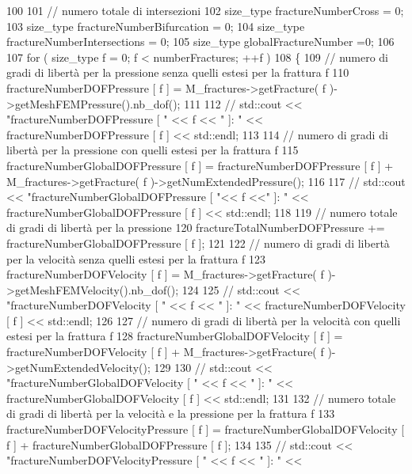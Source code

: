 \begin{DoxyCode}
100 
101     \textcolor{comment}{// numero totale di intersezioni}
102     size\_type fractureNumberCross = 0;
103     size\_type fractureNumberBifurcation = 0;
104     size\_type fractureNumberIntersections = 0;
105     size\_type globalFractureNumber =0;
106     
107     \textcolor{keywordflow}{for} ( size\_type f = 0; f < numberFractures; ++f )
108     \{
109         \textcolor{comment}{// numero di gradi di libertà per la pressione senza quelli estesi per la frattura f}
110         fractureNumberDOFPressure [ f ] = M\_fractures->getFracture( f )->getMeshFEMPressure().nb\_dof();
111         
112   \textcolor{comment}{//      std::cout << "fractureNumberDOFPressure [ " << f << " ]:  " << fractureNumberDOFPressure [ f ] <<
       std::endl;}
113         
114         \textcolor{comment}{// numero di gradi di libertà per la pressione con quelli estesi per la frattura f}
115         fractureNumberGlobalDOFPressure [ f ] = fractureNumberDOFPressure [ f ] + M\_fractures->getFracture(
       f )->getNumExtendedPressure();
116         
117   \textcolor{comment}{//      std::cout << "fractureNumberGlobalDOFPressure [ "<< f <<" ]:  " <<
       fractureNumberGlobalDOFPressure [ f ] << std::endl;}
118 
119         \textcolor{comment}{// numero totale di gradi di libertà per la pressione}
120         fractureTotalNumberDOFPressure += fractureNumberGlobalDOFPressure [ f ];
121 
122         \textcolor{comment}{// numero di gradi di libertà per la velocità senza quelli estesi per la frattura f}
123         fractureNumberDOFVelocity [ f ] = M\_fractures->getFracture( f )->getMeshFEMVelocity().nb\_dof();
124         
125    \textcolor{comment}{//     std::cout << "fractureNumberDOFVelocity [ " << f << " ]:  " << fractureNumberDOFVelocity [ f ] <<
       std::endl;}
126 
127         \textcolor{comment}{// numero di gradi di libertà per la velocità con quelli estesi per la frattura f}
128         fractureNumberGlobalDOFVelocity [ f ] = fractureNumberDOFVelocity [ f ] + M\_fractures->getFracture(
       f )->getNumExtendedVelocity();
129         
130    \textcolor{comment}{//     std::cout << "fractureNumberGlobalDOFVelocity [ " << f << " ]:  " <<
       fractureNumberGlobalDOFVelocity [ f ] << std::endl;}
131 
132         \textcolor{comment}{// numero totale di gradi di libertà per la velocità e la pressione per la frattura f}
133         fractureNumberDOFVelocityPressure [ f ] = fractureNumberGlobalDOFVelocity [ f ] + 
      fractureNumberGlobalDOFPressure [ f ];
134         
135    \textcolor{comment}{//    std::cout << "fractureNumberDOFVelocityPressure [ " << f << " ]:  " <<
}
\end{DoxyCode}
